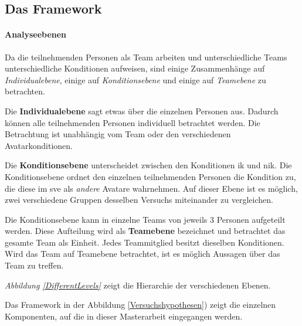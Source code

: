 \documentclass[a4paper,11pt]{article}%
\renewcommand{\\}{\vspace*{0.5\baselineskip} \newline}
\begin{document}
\subsection{Das Framework}

\paragraph{Analyseebenen}
Da die teilnehmenden Personen als Team arbeiten und unterschiedliche Teams unterschiedliche Konditionen aufweisen, sind einige Zusammenhänge auf \textit{Individualebene}, einige auf \textit{Konditionsebene} und einige auf \textit{Teamebene} zu betrachten.

Die \textbf{Individualebene} sagt etwas über die einzelnen Personen aus. Dadurch können alle teilnehmenden Personen individuell betrachtet werden. Die Betrachtung ist unabhängig vom Team oder den verschiedenen Avatarkonditionen. 

Die \textbf{Konditionsebene} unterscheidet zwischen den Konditionen \ac{ik} und \ac{nik}. Die Konditionsebene ordnet den einzelnen teilnehmenden Personen die Kondition zu, die diese im \ac{sve} als \textit{andere} Avatare wahrnehmen. Auf dieser Ebene ist es möglich, zwei verschiedene Gruppen desselben Versuchs miteinander zu vergleichen. 

Die Konditionsebene kann in einzelne Teams von jeweils 3 Personen aufgeteilt werden. Diese Aufteilung wird als \textbf{Teamebene} bezeichnet und betrachtet das gesamte Team als Einheit. Jedes Teammitglied besitzt dieselben Konditionen. Wird das Team auf Teamebene betrachtet, ist es möglich Aussagen über das Team zu treffen. 

\textit{Abbildung \ref{DifferentLevels}} zeigt die Hierarchie der verschiedenen Ebenen.

Das Framework in der Abbildung \ref{Versuchshypothesen}) zeigt die einzelnen Komponenten, auf die in dieser Masterarbeit eingegangen werden. 
\end{document}
